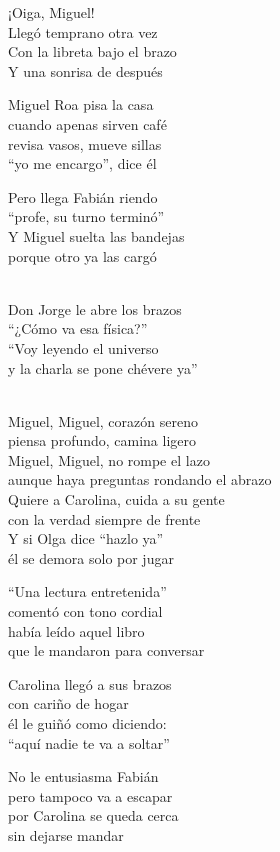 \begin{lyrics}
¡Oiga, Miguel!\\
Llegó temprano otra vez\\
Con la libreta bajo el brazo\\
Y una sonrisa de después

Miguel Roa pisa la casa\\
cuando apenas sirven café\\
revisa vasos, mueve sillas\\
“yo me encargo”, dice él

Pero llega Fabián riendo\\
“profe, su turno terminó”\\
Y Miguel suelta las bandejas\\
porque otro ya las cargó

\\
Don Jorge le abre los brazos\\
“¿Cómo va esa física?”\\
“Voy leyendo el universo\\
y la charla se pone chévere ya”

\\
Miguel, Miguel, corazón sereno\\
piensa profundo, camina ligero\\
Miguel, Miguel, no rompe el lazo\\
aunque haya preguntas rondando el abrazo\\
Quiere a Carolina, cuida a su gente\\
con la verdad siempre de frente\\
Y si Olga dice “hazlo ya”\\
él se demora solo por jugar

“Una lectura entretenida”\\
comentó con tono cordial\\
había leído aquel libro\\
que le mandaron para conversar

Carolina llegó a sus brazos\\
con cariño de hogar\\
él le guiñó como diciendo:\\
“aquí nadie te va a soltar”

No le entusiasma Fabián\\
pero tampoco va a escapar\\
por Carolina se queda cerca\\
sin dejarse mandar


\end{lyrics}
